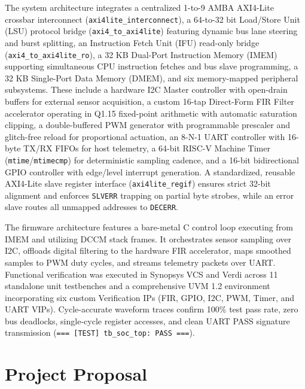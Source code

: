 \documentclass[12pt,a4paper,oneside]{report}
\begin{document}
The system architecture integrates a centralized 1-to-9 AMBA AXI4-Lite crossbar interconnect (\texttt{axi4lite\_interconnect}), a 64-to-32 bit Load/Store Unit (LSU) protocol bridge (\texttt{axi4\_to\_axi4lite}) featuring dynamic bus lane steering and burst splitting, an Instruction Fetch Unit (IFU) read-only bridge (\texttt{axi4\_to\_axi4lite\_ro}), a 32 KB Dual-Port Instruction Memory (IMEM) supporting simultaneous CPU instruction fetches and bus slave programming, a 32 KB Single-Port Data Memory (DMEM), and six memory-mapped peripheral subsystems. These include a hardware I2C Master controller with open-drain buffers for external sensor acquisition, a custom 16-tap Direct-Form FIR Filter accelerator operating in Q1.15 fixed-point arithmetic with automatic saturation clipping, a double-buffered PWM generator with programmable prescaler and glitch-free reload for proportional actuation, an 8-N-1 UART controller with 16-byte TX/RX FIFOs for host telemetry, a 64-bit RISC-V Machine Timer (\texttt{mtime}/\texttt{mtimecmp}) for deterministic sampling cadence, and a 16-bit bidirectional GPIO controller with edge/level interrupt generation. A standardized, reusable AXI4-Lite slave register interface (\texttt{axi4lite\_regif}) ensures strict 32-bit alignment and enforces \texttt{SLVERR} trapping on partial byte strobes, while an error slave routes all unmapped addresses to \texttt{DECERR}.

The firmware architecture features a bare-metal C control loop executing from IMEM and utilizing DCCM stack frames. It orchestrates sensor sampling over I2C, offloads digital filtering to the hardware FIR accelerator, maps smoothed samples to PWM duty cycles, and streams telemetry packets over UART. Functional verification was executed in Synopsys VCS and Verdi across 11 standalone unit testbenches and a comprehensive UVM 1.2 environment incorporating six custom Verification IPs (FIR, GPIO, I2C, PWM, Timer, and UART VIPs). Cycle-accurate waveform traces confirm 100\% test pass rate, zero bus deadlocks, single-cycle register accesses, and clean UART PASS signature transmission (\texttt{=== [TEST] tb\_soc\_top: PASS ===}).

\newpage
\tableofcontents
\newpage
\listoffigures
\newpage
\listoftables

\newpage
{}
\setcounter{page}{1}

\chapter{Project Proposal}
\end{document}
